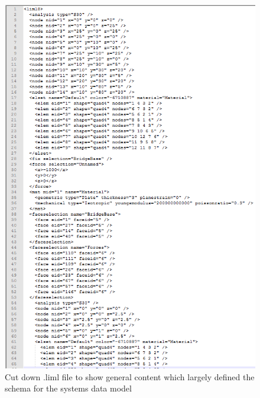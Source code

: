\begin{figure}[H]
  \centerline{\includegraphics[width=120mm,  scale=0.5]{../Graphics/limlFileLayout.png}}
  \caption{Cut down .liml file to show general content which largely defined the schema for the systems data model}
\end{figure}


